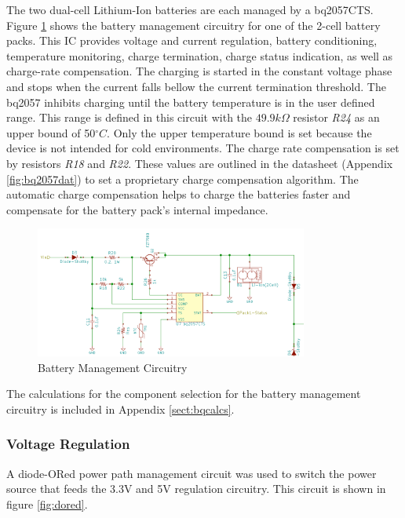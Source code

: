 \documentclass{article}
\numberwithin{figure}{section}
\numberwithin{equation}{section}
\begin{document}
{The two dual-cell Lithium-Ion batteries are each managed by a bq2057CTS. Figure \ref{fig:batman} shows the battery management circuitry for one of the 2-cell battery packs. This IC provides voltage and current regulation, battery conditioning, temperature monitoring, charge termination, charge status indication, as well as charge-rate compensation. The charging is started in the constant voltage phase and stops when the current falls bellow the current termination threshold. The bq2057 inhibits charging until the battery temperature is in the user defined range. This range is defined in this circuit with the $49.9k\Omega$ resistor \textit{R24} as an upper bound of 50$^{\circ}C$. Only the upper temperature bound is set because the device is not intended for cold environments. The charge rate compensation is set by resistors \textit{R18} and \textit{R22}. These values are outlined in the datasheet (Appendix \ref{fig:bq2057dat}) to set a proprietary charge compensation algorithm. The automatic charge compensation helps to charge the batteries faster and compensate for the battery pack's internal impedance.

\begin{figure}[H]
	\centering
	\includegraphics[width=0.8\textwidth]{BatteryManage}
	\caption{Battery Management Circuitry}
	\label{fig:batman}
\end{figure}

The calculations for the component selection for the battery management circuitry is included in Appendix \ref{sect:bqcalcs}.

\subsubsection{Voltage Regulation}

A diode-ORed power path management circuit was used to switch the power source that feeds the 3.3V and 5V regulation circuitry. This circuit is shown in figure \ref{fig:dored}.

}
\end{document}
